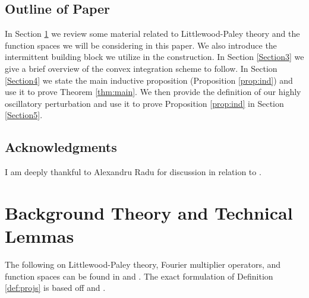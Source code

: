 \documentclass[12pt,reqno,letterpaper]{amsart}
\numberwithin{equation}{section}
\newcommand{\1}{{\bf 1}}
\newcommand{\2}{{\bf 2}}
\theoremstyle{remark}
\theoremstyle{remark}
\begin{document}
\subsection{Outline of Paper}
In Section \ref{Section2} we review some material related to Littlewood-Paley theory and the function spaces we will be considering in this paper. We also introduce the intermittent building block we utilize in the construction. In Section \ref{Section3} we give a brief overview of the convex integration scheme to follow. In Section \ref{Section4} we state the main inductive proposition (Proposition \ref{prop:ind}) and use it to prove Theorem \ref{thm:main}. We then provide the definition of our highly oscillatory perturbation and use it to prove Proposition \ref{prop:ind} in Section \ref{Section5}.










\subsection{Acknowledgments} I am deeply thankful to Alexandru Radu for discussion in relation to \cite{GR}.












\section{Background Theory and Technical Lemmas}\label{Section2}


The following on Littlewood-Paley theory, Fourier multiplier operators, and function spaces can be found in \cite{BCD} and \cite{Grafakos}. The exact formulation of Definition \ref{def:projs} is based off \cite[Definition 2.1]{ABGN} and \cite[Equation 4.9]{BSV}.
\end{document}
